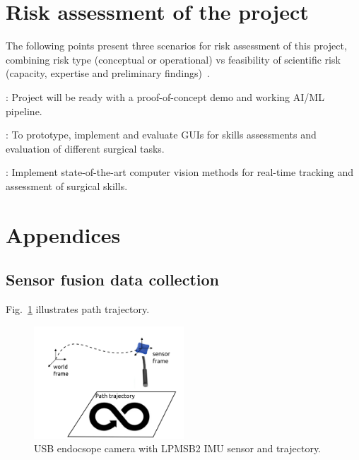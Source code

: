 \documentclass[11pt]{article}
\begin{document}
\section{Risk assessment of the project}
The following points present three scenarios for risk assessment of this project, combining risk type (conceptual or operational) vs feasibility of scientific risk (capacity, expertise and preliminary findings)~\cite{Bar-Zeev_ERC-risk}.

\begin{description}[align=left]
\item [Low-risk]: Project will be ready with a proof-of-concept demo and working AI/ML pipeline.
\item [Mid-risk]: To prototype, implement and evaluate GUIs for skills assessments and evaluation of different surgical tasks. 
\item [High-risk]: Implement state-of-the-art computer vision methods for real-time tracking and assessment of surgical skills.
\end{description}

\newpage
\section*{Appendices}
\subsection*{Sensor fusion data collection}
Fig.~\ref{fig:experiment00} illustrates path trajectory.
\begin{figure}[h]
\centering
\includegraphics[width=0.5\textwidth]{experiment00/outputs/drawing-v00}
    \caption{
        USB endocsope camera with LPMSB2 IMU sensor and trajectory.
	    }
\label{fig:experiment00}
\end{figure}
\end{document}
